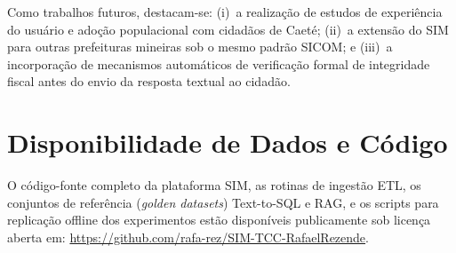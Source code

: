 \documentclass[12pt]{article}
\begin{document}
Como trabalhos futuros, destacam-se: (i)~a realização de estudos de experiência do usuário e adoção populacional com cidadãos de Caeté; (ii)~a extensão do SIM para outras prefeituras mineiras sob o mesmo padrão SICOM; e (iii)~a incorporação de mecanismos automáticos de verificação formal de integridade fiscal antes do envio da resposta textual ao cidadão.

\section*{Disponibilidade de Dados e Código}

O código-fonte completo da plataforma SIM, as rotinas de ingestão ETL, os conjuntos de referência (\textit{golden datasets}) Text-to-SQL e RAG, e os scripts para replicação offline dos experimentos estão disponíveis publicamente sob licença aberta em: \url{https://github.com/rafa-rez/SIM-TCC-RafaelRezende}.

\begingroup
\footnotesize

\endgroup
\end{document}
